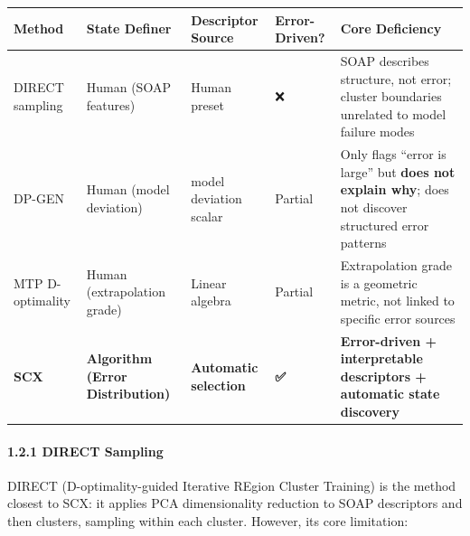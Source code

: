 \documentclass[
  12pt,
]{article}
\begin{document}
\begin{longtable}[]{@{}
  >{\raggedright\arraybackslash}p{}
  >{\raggedright\arraybackslash}p{}
  >{\raggedright\arraybackslash}p{}
  >{\raggedright\arraybackslash}p{}
  >{\raggedright\arraybackslash}p{}@{}}
\toprule\noalign{}
\begin{minipage}[b]{\linewidth}\raggedright
Method
\end{minipage} & \begin{minipage}[b]{\linewidth}\raggedright
State Definer
\end{minipage} & \begin{minipage}[b]{\linewidth}\raggedright
Descriptor Source
\end{minipage} & \begin{minipage}[b]{\linewidth}\raggedright
Error-Driven?
\end{minipage} & \begin{minipage}[b]{\linewidth}\raggedright
Core Deficiency
\end{minipage} \\
\midrule\noalign{}
\endhead
\bottomrule\noalign{}
\endlastfoot
DIRECT sampling & Human (SOAP features) & Human preset & ❌ & SOAP describes structure, not error; cluster boundaries unrelated to model failure modes \\
DP-GEN & Human (model deviation) & model deviation scalar & Partial & Only flags ``error is large'' but \textbf{does not explain why}; does not discover structured error patterns \\
MTP D-optimality & Human (extrapolation grade) & Linear algebra & Partial & Extrapolation grade is a geometric metric, not linked to specific error sources \\
\textbf{SCX} & \textbf{Algorithm (Error Distribution)} & \textbf{Automatic selection} & \textbf{✅} & \textbf{Error-driven + interpretable descriptors + automatic state discovery} \\
\end{longtable}

\paragraph{1.2.1 DIRECT Sampling}\label{direct-sampling}

DIRECT (D-optimality-guided Iterative REgion Cluster Training) is the method closest to SCX: it applies PCA dimensionality reduction to SOAP descriptors and then clusters, sampling within each cluster. However, its core limitation:
\end{document}
